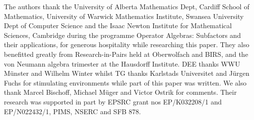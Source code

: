 \documentclass[12pt]{article}
\numberwithin{equation}{section}
\begin{document}
\def\Duke              {Duke Math.\ J.}
\def\K                 {K-theory}
\def\JOP               {J.\ Oper.\ Theory}

\vspace{0.2cm}\addtolength{\baselineskip}{-2pt}
\begin{footnotesize}

The authors thank the University of Alberta Mathematics Dept, Cardiff School of Mathematics,  University of Warwick 
Mathematics Institute, Swansea University Dept of Computer Science and the  Isaac Newton Institute for Mathematical Sciences, Cambridge during the programme Operator Algebras: Subfactors and their applications, for generous hospitality while researching this
paper. They also benefitted greatly from Research-in-Pairs held at Oberwolfach and BIRS,
and the von Neumann algebra trimester at the Hausdorff Institute. 
DEE thanks  WWU M\" unster and Wilhelm Winter whilst TG thanks Karlstads Universitet and J\"urgen Fuchs for stimulating environments while part of this paper was written. We also thank Marcel Bischoff, Michael M\"uger and Victor Ostrik for comments.
Their research was supported in part by  EPSRC grant nos EP/K032208/1 and EP/N022432/1, PIMS, NSERC and SFB 878.


\end{footnotesize}
\end{document}
